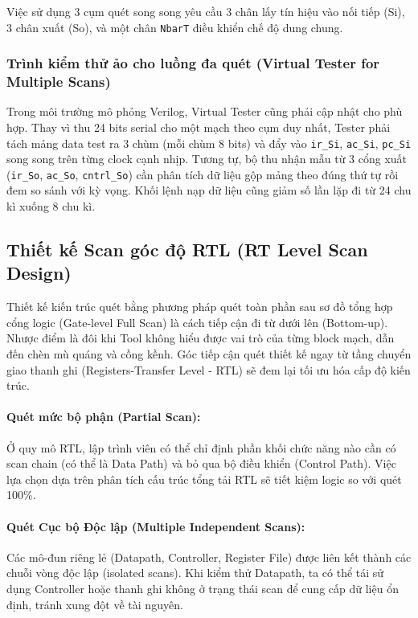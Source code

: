 Việc sử dụng 3 cụm quét song song yêu cầu 3 chân lấy tín hiệu vào nối tiếp (Si), 3 chân xuất (So), và một chân \texttt{NbarT} điều khiển chế độ dung chung.

\subsubsection{Trình kiểm thử ảo cho luồng đa quét (Virtual Tester for Multiple Scans)}
Trong môi trường mô phỏng Verilog, Virtual Tester cũng phải cập nhật cho phù hợp. Thay vì thu 24 bits serial cho một mạch theo cụm duy nhất, Tester phải tách mảng data test ra 3 chùm (mỗi chùm 8 bits) và đẩy vào \texttt{ir\_Si}, \texttt{ac\_Si}, \texttt{pc\_Si} song song trên từng clock cạnh nhịp. Tương tự, bộ thu nhận mẫu từ 3 cổng xuất (\texttt{ir\_So}, \texttt{ac\_So}, \texttt{cntrl\_So}) cần phân tích dữ liệu gộp mảng theo đúng thứ tự rồi đem so sánh với kỳ vọng.
Khối lệnh nạp dữ liệu cũng giảm số lần lặp đi từ 24 chu kì xuống 8 chu kì.

\subsection{Thiết kế Scan góc độ RTL (RT Level Scan Design)}
Thiết kế kiến trúc quét bằng phương pháp quét toàn phần sau sơ đồ tổng hợp cổng logic (Gate-level Full Scan) là cách tiếp cận đi từ dưới lên (Bottom-up). Nhược điểm là đôi khi Tool không hiểu được vai trò của từng block mạch, dẫn đến chèn mù quáng và cồng kềnh. Góc tiếp cận quét thiết kế ngay từ tầng chuyển giao thanh ghi (Registers-Transfer Level - RTL) sẽ đem lại tối ưu hóa cấp độ kiến trúc.

\paragraph{Quét mức bộ phận (Partial Scan):}
Ở quy mô RTL, lập trình viên có thể chỉ định phần khối chức năng nào cần có scan chain (có thể là Data Path) và bỏ qua bộ điều khiển (Control Path). Việc lựa chọn dựa trên phân tích cấu trúc tổng tải RTL sẽ tiết kiệm logic so với quét 100\%. 

\paragraph{Quét Cục bộ Độc lập (Multiple Independent Scans):}
Các mô-đun riêng lẻ (Datapath, Controller, Register File) được liên kết thành các chuỗi vòng độc lập (isolated scans). Khi kiểm thử Datapath, ta có thể tái sử dụng Controller hoặc thanh ghi không ở trạng thái scan để cung cấp dữ liệu ổn định, tránh xung đột về tài nguyên. 

